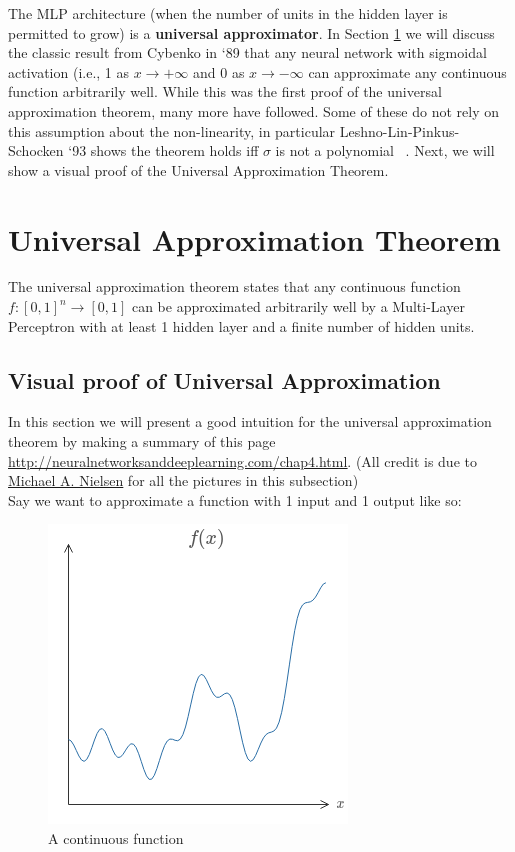 \documentclass{article}
\begin{document}
\vspace{5mm}

The MLP architecture (when the number of units in the hidden layer is permitted to grow) is a \textbf{universal approximator}. In Section \ref{sec:uat} we will discuss the classic result from Cybenko in `89 \citep{cybenko1989approximation} that any neural network with sigmoidal activation (i.e., 1 as $x \to +\infty$ and 0 as $x \to -\infty$ can approximate any continuous function arbitrarily well. While this was the first proof of the universal approximation theorem, many more have followed. Some of these do not rely on this assumption about the non-linearity, in particular Leshno-Lin-Pinkus-Schocken `93 shows the theorem holds iff $\sigma$ is not a polynomial ~\citep{journals/nn/LeshnoLPS93}. Next, we will show a visual proof of the Universal Approximation Theorem.



\section{Universal Approximation Theorem}
\label{sec:uat}

The universal approximation theorem states that any continuous function $f :[0,1]^n \xrightarrow{} [0,1]$
can be approximated arbitrarily well by a Multi-Layer Perceptron with at least 1 hidden layer and a finite number of hidden units.  \par

\subsection{Visual proof of Universal Approximation}
In this section we will present a good intuition for the universal approximation theorem by making a summary of this page \href{http://neuralnetworksanddeeplearning.com/chap4.html}{\underline{http://neuralnetworksanddeeplearning.com/chap4.html}}. (All credit is due to \href{http://neuralnetworksanddeeplearning.com/}{\underline{Michael A. Nielsen}} for all the pictures in this subsection) \\

Say we want to approximate a function with 1 input and 1 output like so:
\begin{figure}[H]
    \centering
    \includegraphics[width=.4\textwidth]{figures/function.png}
    \caption{A continuous function}
\end{figure}
\end{document}
